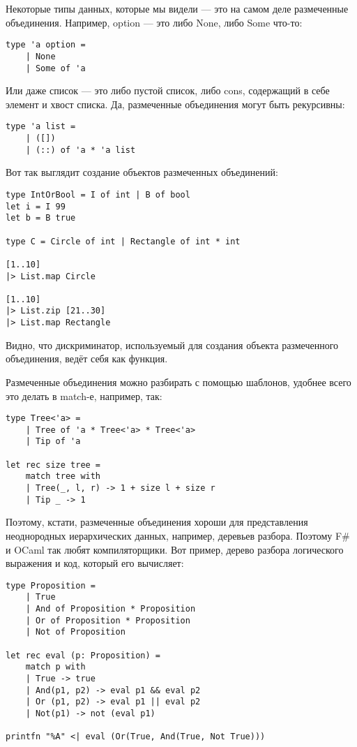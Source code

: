 \documentclass[a5paper]{article}
\begin{document}
Некоторые типы данных, которые мы видели --- это на самом деле размеченные объединения. Например, option --- это либо None, либо Some что-то:

\begin{verbatim}
type 'a option =
    | None
    | Some of 'a
\end{verbatim}

Или даже список --- это либо пустой список, либо cons, содержащий в себе элемент и хвост списка. Да, размеченные объединения могут быть рекурсивны:

\begin{verbatim}
type 'a list =
    | ([])
    | (::) of 'a * 'a list
\end{verbatim}

Вот так выглядит создание объектов размеченных объединений:

\begin{verbatim}
type IntOrBool = I of int | B of bool
let i = I 99
let b = B true

type C = Circle of int | Rectangle of int * int

[1..10]
|> List.map Circle

[1..10]
|> List.zip [21..30]
|> List.map Rectangle
\end{verbatim}

Видно, что дискриминатор, используемый для создания объекта размеченного объединения, ведёт себя как функция.

Размеченные объединения можно разбирать с помощью шаблонов, удобнее всего это делать в match-е, например, так:

\begin{verbatim}
type Tree<'a> =
    | Tree of 'a * Tree<'a> * Tree<'a>
    | Tip of 'a

let rec size tree =
    match tree with
    | Tree(_, l, r) -> 1 + size l + size r
    | Tip _ -> 1
\end{verbatim}

Поэтому, кстати, размеченные объединения хороши для представления неоднородных иерархических данных, например, деревьев разбора. Поэтому F\# и OCaml так любят компиляторщики. Вот пример, дерево разбора логического выражения и код, который его вычисляет:

\begin{verbatim}
type Proposition =
    | True
    | And of Proposition * Proposition
    | Or of Proposition * Proposition
    | Not of Proposition

let rec eval (p: Proposition) =
    match p with
    | True -> true
    | And(p1, p2) -> eval p1 && eval p2
    | Or (p1, p2) -> eval p1 || eval p2
    | Not(p1) -> not (eval p1)

printfn "%A" <| eval (Or(True, And(True, Not True)))
\end{verbatim}
\end{document}
